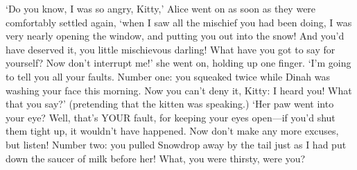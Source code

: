  `Do you know, I was so angry, Kitty,' Alice went on as soon as
they were comfortably settled again, `when I saw all the mischief
you had been doing, I was very nearly opening the window, and
putting you out into the snow!  And you'd have deserved it, you
little mischievous darling!  What have you got to say for
yourself?  Now don't interrupt me!' she went on, holding up one
finger.  `I'm going to tell you all your faults.  Number one:
you squeaked twice while Dinah was washing your face this
morning.  Now you can't deny it, Kitty:  I heard you!  What that
you say?' (pretending that the kitten was speaking.)  `Her paw
went into your eye?  Well, that's YOUR fault, for keeping your
eyes open---if you'd shut them tight up, it wouldn't have
happened.  Now don't make any more excuses, but listen!  Number
two:  you pulled Snowdrop away by the tail just as I had put down
the saucer of milk before her!  What, you were thirsty, were you?
